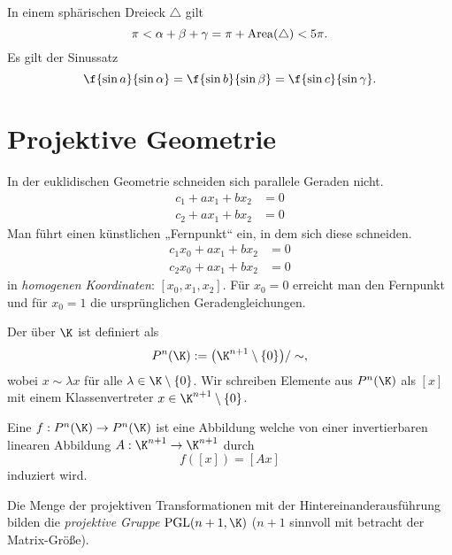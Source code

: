 In einem sphärischen Dreieck $\triangle$ gilt
\[
	\pi
	< \alpha + \beta + \gamma
	= \pi + \operatorname{Area}(\triangle)
	< 5 \pi.
\]
Es gilt der Sinussatz
\[
	\f {\sin a}{\sin \alpha}
	= \f {\sin b}{\sin \beta}
	= \f {\sin c}{\sin \gamma}.
\]



\section{Projektive Geometrie}


In der euklidischen Geometrie schneiden sich parallele Geraden nicht.
\begin{align*}
	c_1 + ax_1 + bx_2 &= 0 \\
	c_2 + ax_1 + bx_2 &= 0
\end{align*}
Man führt einen künstlichen „Fernpunkt“ ein, in dem sich diese schneiden.
\begin{align*}
	c_1 x_0 + a x_1 + b x_2 &= 0 \\
	c_2 x_0 + a x_1 + b x_2 &= 0
\end{align*}
in \emph{homogenen Koordinaten}: $[x_0, x_1, x_2]$.
Für $x_0 = 0$ erreicht man den Fernpunkt und für $x_0 = 1$ die ursprünglichen Geradengleichungen.


\begin{df}
	Der  über $\K$ ist definiert als
	\[
		P^n(\K) := \big( \K^{n+1} \setminus \{ 0 \} \big) / \sim,
	\]
	wobei $x \sim \lambda x$ für alle $\lambda \in \K \setminus \{0\}$.
	Wir schreiben Elemente aus $P^n(\K)$ als $[x]$ mit einem Klassenvertreter $x \in \K^{n+1} \setminus \{0\}$.

	Eine  $f: P^n(\K) \to P^n(\K)$ ist eine Abbildung welche von einer invertierbaren linearen Abbildung $A: \K^{n+1} \to \K^{n+1}$ durch
	\[
		f([x]) = [Ax]
	\]
	induziert wird.

	Die Menge der projektiven Transformationen mit der Hintereinanderausführung bilden die \emph{projektive Gruppe} $\PGL(n+1, \K)$ ($n+1$ sinnvoll mit betracht der Matrix-Größe).
\end{df}

